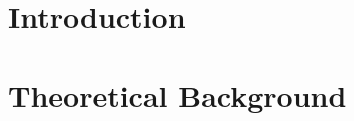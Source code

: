 \documentclass[12pt,twoside]{report}
\renewcommand{\_}{%
  \textunderscore\hspace{0pt}%
}
\begin{document}







\chapter{Introduction}

\chapter{Theoretical Background}\label{background}

%
\end{document}
